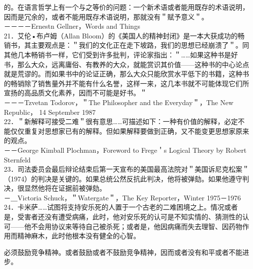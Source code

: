 的。在语言哲学上有一个与之等价的问题：一个新术语或者能用既存的术语说明，因而是冗余的，或者不能用既存术语说明，那就没有＂赋予意义＂。\\
－－－－Ernestn Gellner，Words and Things\\
21．艾伦•布卢姆（Allan Bloom）的《美国人的精神封闭》是一本大获成功的畅销书，其主要观点是：＂我们的文化正在走下坡路，我们的思想已经崩溃了＂。同其他几本畅销书一样，它们受到许多批判，评论家指出：＂……如果这种书是好书，那么大众，远离庸俗、有教养的大众，就能赏识其价值——这种书的中心论点就是荒谬的。而如果书中的论证正确，那么大众只能欣赏水平低下的书籍，这种书的畅销除了销售量外并不能有什么名誉，这样一来，这几本书就不可能体现它们所宣扬的高品质文化素养，因而不可能是好书。＂\\
－－－Tzvetan Todorov，＂The Philosopher and the Everyday＂，The New Republic， 14 September 1987\\
22．＂新解释可接受二难＂很有意思……可描述如下：一种有价值的解释，必定不能仅仅重复对思想家已有的解释。但如果解释要做到正确，又不能变更思想家原来的观点。\\
－－George Kimball Plochman，Foreword to Frege＇s Logical Theory by Robert Sternfeld\\
23．司法委员会最后辩论结束后第一天宣布的美国最高法院对＂美国诉尼克松案＂（1974）的判决是关键的。如果总统公然反抗此判决，他将被弹劾。如果他遵守判决，很显然他将在证据前被弹劾。\\
－＿Victoria Schuck，＂Watergate＂，The Key Reporter，Winter 1975－1976\\
24．卡米萨……试图将支持安乐死的人置于一个古老的二难困境之上。情况或者是，受害者还没有遭受病痛，此时，他对安乐死的认可是不知实情的、猜测性的认可——他不会用协议来等待自己被杀死；或者是，他因病痛而失去理智、因药物作用而精神麻木，此时他根本没有健全的心智。

必须鼓励竞争精神。或者鼓励或者不鼓励竞争精神，因而或者没有和平或者不能进步。

